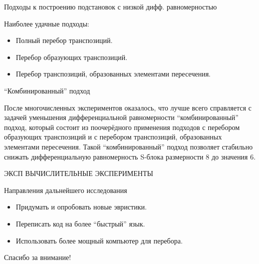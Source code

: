 \documentclass[11pt]{beamer}
\begin{document}
\begin{frame}{Подходы к построению подстановок с низкой дифф. равномерностью}

Наиболее удачные подходы:

\begin{itemize}
\item Полный перебор транспозиций.
\item Перебор образующих транспозиций.
\item Перебор транспозиций, образованных элементами пересечения.
\end{itemize}

\end{frame}





\begin{frame}{``Комбинированный'' подход}

После многочисленных экспериментов оказалось, что лучше всего справляется с задачей уменьшения дифференциальной равномерности ``комбинированный'' подход, который состоит из поочерёдного применения подходов с перебором образующих транспозиций и с перебором транспозиций, образованных элементами пересечения. Такой ``комбинированный'' подход позволяет стабильно снижать дифференциальную равномерность S-блока размерности 8 до значения 6.

\end{frame}



\begin{frame}{ЭКСП}
ВЫЧИСЛИТЕЛЬНЫЕ ЭКСПЕРИМЕНТЫ
\end{frame}

\begin{frame}{Направления дальнейшего исследования}

\begin{itemize}
\item Придумать и опробовать новые эвристики.
\item Переписать код на более ``быстрый'' язык.
\item Использовать более мощный компьютер для перебора.
\end{itemize}

\end{frame}
\begin{frame}
\centerline{Спасибо за внимание!}
\end{frame}
\end{document}
